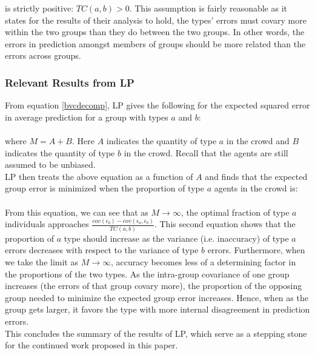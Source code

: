 \documentclass[twoside,twocolumn]{article}
\begin{document}
is strictly positive: $TC(a,b) > 0$. This assumption is fairly reasonable as it states for the results of their analysis to hold, the types' errors must covary more within the two groups than they do between the two groups. In other words, the errors in prediction amongst members of groups should be more related than the errors across groups.

\subsubsection{Relevant Results from LP}

From equation \ref{bvcdecomp}, LP gives the following for the expected squared error in average prediction for a group with types $a$ and $b$:\\

\\


where $M = A + B$. Here $A$ indicates the quantity of type $a$ in the crowd and $B$ indicates the quantity of type $b$ in the crowd. Recall that the agents are still assumed to be unbiased.\\
\newline
LP then treats the above equation as a function of $A$ and finds that the expected group error is minimized when the proportion of type $a$ agents in the crowd is:\\

\\

From this equation, we can see that as $M \rightarrow \infty$, the optimal fraction of type $a$ individuals approaches $\frac{cov(\epsilon_b) - cov(\epsilon_a,\epsilon_b)}{TC(a,b)}$. This second equation shows that the proportion of $a$ type should increase as the variance (i.e. inaccuracy) of type $a$ errors decreases with respect to the variance of type $b$ errors. Furthermore, when we take the limit as $M \rightarrow \infty$, accuracy becomes less of a determining factor in the proportions of the two types. As the intra-group covariance of one group increases (the errors of that group covary more), the proportion of the opposing group needed to minimize the expected group error increases. Hence, when as the group gets larger, it favors the type with more internal disagreement in prediction errors.\\
\newline
This concludes the summary of the results of LP, which serve as a stepping stone for the continued work proposed in this paper.
\end{document}
